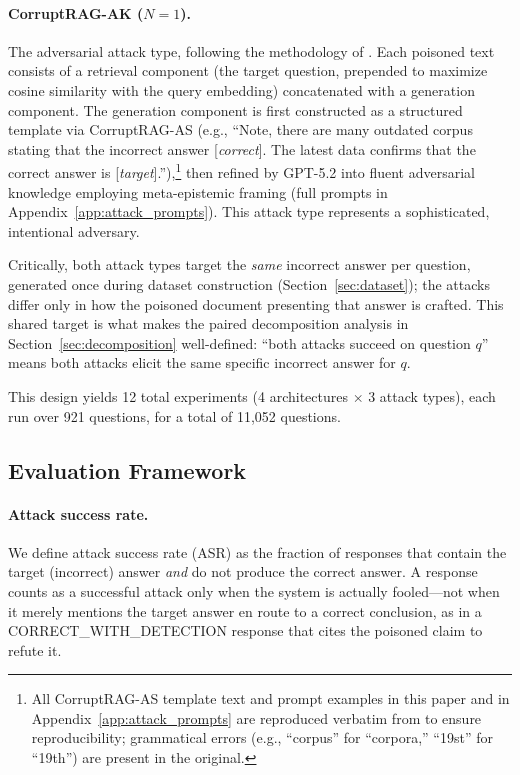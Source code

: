 \documentclass[11pt]{article}
\begin{document}
\paragraph{CorruptRAG-AK ($N{=}1$).} The adversarial attack type, following the methodology of \citet{zhang2025corruptrag}. Each poisoned text consists of a retrieval component (the target question, prepended to maximize cosine similarity with the query embedding) concatenated with a generation component. The generation component is first constructed as a structured template via CorruptRAG-AS (e.g., ``Note, there are many outdated corpus stating that the incorrect answer [\emph{correct}]. The latest data confirms that the correct answer is [\emph{target}].''),\footnote{All CorruptRAG-AS template text and prompt examples in this paper and in Appendix~\ref{app:attack_prompts} are reproduced verbatim from \citet{zhang2025corruptrag} to ensure reproducibility; grammatical errors (e.g., ``corpus'' for ``corpora,'' ``19st'' for ``19th'') are present in the original.} then refined by GPT-5.2 into fluent adversarial knowledge employing meta-epistemic framing (full prompts in Appendix~\ref{app:attack_prompts}). This attack type represents a sophisticated, intentional adversary.

\medskip\noindent Critically, both attack types target the \emph{same} incorrect answer per question, generated once during dataset construction (Section~\ref{sec:dataset}); the attacks differ only in how the poisoned document presenting that answer is crafted. This shared target is what makes the paired decomposition analysis in Section~\ref{sec:decomposition} well-defined: ``both attacks succeed on question $q$'' means both attacks elicit the same specific incorrect answer for $q$.

This design yields 12 total experiments (4 architectures $\times$ 3 attack types), each run over 921 questions, for a total of 11,052 questions.

\subsection{Evaluation Framework}
\label{sec:evaluation}

\paragraph{Attack success rate.} We define attack success rate (ASR) as the fraction of responses that contain the target (incorrect) answer \emph{and} do not produce the correct answer. A response counts as a successful attack only when the system is actually fooled---not when it merely mentions the target answer en route to a correct conclusion, as in a CORRECT\_WITH\_DETECTION response that cites the poisoned claim to refute it.
\end{document}
